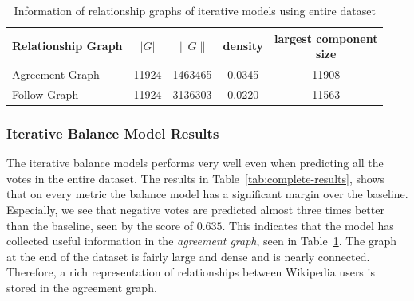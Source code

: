 \begin{table}[htp]
    \centering
    \caption{Information of relationship graphs of iterative models using entire \wikirfa dataset}
    \label{tab:iterative-graphs}
    \begin{tabular}{lcccc}
        \toprule
        Relationship Graph & $|G|$ & $\|G\|$ & density & \shortstack{largest component \\size}\\
        \midrule
        
        Agreement Graph& 11924 &1463465 & 0.0345 & 11908\\
        
        Follow Graph & 11924 & 3136303 & 0.0220 & 11563 \\


        \bottomrule
        \end{tabular}
\end{table}

\subsubsection{Iterative Balance Model Results}
The iterative balance models performs very well even when predicting all the votes in the entire \wikirfa dataset.
The results in Table~\ref{tab:complete-results}, shows that on every metric the balance model has a significant margin over the baseline.
Especially, we see that negative votes are predicted almost three times better than the baseline, seen by the \aucnegPR score of $0.635$.
This indicates that the model has collected useful information in the \textit{agreement graph}, seen in Table~\ref{tab:iterative-graphs}.
The graph at the end of the dataset is fairly large and dense and is nearly connected.
Therefore, a rich representation of relationships between Wikipedia users is stored in the agreement graph.

